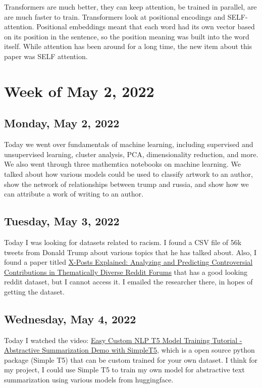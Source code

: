 \documentclass[11pt,letterpaper]{article}
\begin{document}
Transformers are much better, they can keep attention, be trained in parallel, are are much faster to train. Transformers look at positional encodings and SELF-attention. Positional embeddings meant that each word had its own vector based on its position in the sentence, so the position meaning was built into the word itself. While attention has been around for a long time, the new item about this paper was SELF attention.

\section{Week of May 2, 2022}
\subsection{Monday, May 2, 2022}
Today we went over fundamentals of machine learning, including supervised and unsupervised learning, cluster analysis, PCA, dimensionality reduction, and more. We also went through three mathemtica notebooks on machine learning. We talked about how various models could be used to classify artwork to an author, show the network of relationships between trump and russia, and show how we can attribute a work of writing to an author.

\subsection{Tuesday, May 3, 2022}
Today I was looking for datasets related to racism. I found a CSV file of 56k tweets from Donald Trump about various topics that he has talked about. Also, I found a paper titled \href{https://ojs.aaai.org/index.php/ICWSM/article/view/18050/17853}{X-Posts Explained: Analyzing and Predicting Controversial Contributions in Thematically Diverse Reddit Forums} that has a good looking reddit dataset, but I cannot access it. I emailed the researcher there, in hopes of getting the dataset. 

\subsection{Wednesday, May 4, 2022}
Today I watched the video: \href{https://www.youtube.com/watch?v=jgKj-7v2UYU}{Easy Custom NLP T5 Model Training Tutorial - Abstractive Summarization Demo with SimpleT5}, which is a open source python package (Simple T5) that can be custom trained for your own dataset. I think for my project, I could use Simple T5 to train my own model for abstractive text summarization using various models from huggingface. 
\end{document}
